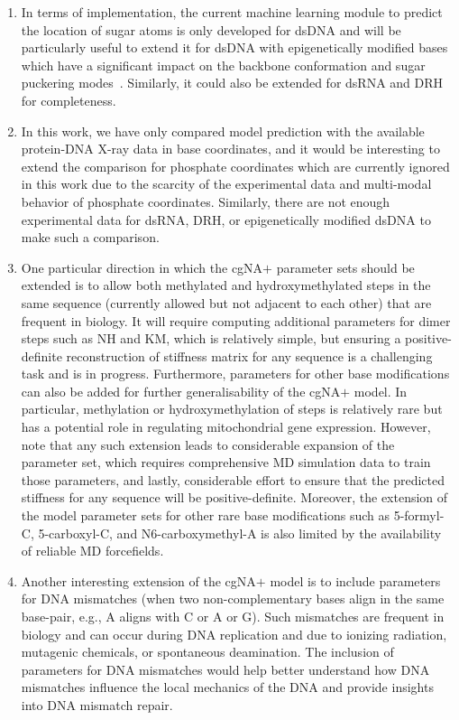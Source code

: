 \begin{enumerate}

\item  In terms of implementation, the current machine learning module to predict the location of sugar atoms is only developed for dsDNA and will be particularly useful to extend it for dsDNA with epigenetically modified bases which have a significant impact on the backbone conformation and sugar puckering modes~\cite{banyay2002structural,liebl2019methyl}.
Similarly, it could also be extended for dsRNA and DRH for completeness.

\item In this work, we have only compared model prediction with the available protein-DNA X-ray data in base coordinates, and it would be interesting to extend the comparison for phosphate coordinates which are currently ignored in this work due to the scarcity of the experimental data and multi-modal behavior of phosphate coordinates. 
Similarly, there are not enough experimental data for dsRNA, DRH, or epigenetically modified dsDNA to make such a comparison. 

\item One particular direction in which the cgNA$+$ parameter sets should be extended is to allow both methylated and hydroxymethylated \cpg steps in the same sequence (currently allowed but not adjacent to each other) that are frequent in biology.
It will require computing additional parameters for dimer steps such as NH and KM, which is relatively simple, but ensuring a positive-definite reconstruction of stiffness matrix for any sequence is a challenging task and is in progress.
Furthermore, parameters for other base modifications can also be added for further generalisability of the cgNA$+$ model. 
In particular, methylation or hydroxymethylation of \gpc steps is relatively rare but has a potential role in regulating mitochondrial gene expression.
However, note that any such extension leads to considerable expansion of the parameter set, which requires comprehensive MD simulation data to train those parameters, and lastly, considerable effort to ensure that the predicted stiffness for any sequence will be positive-definite.
Moreover, the extension of the model parameter sets for other rare base modifications such as 5-formyl-C, 5-carboxyl-C, and N6-carboxymethyl-A is also limited by the availability of reliable MD forcefields.

\item Another interesting extension of the cgNA$+$ model is to include parameters for DNA mismatches (when two non-complementary bases align in the same base-pair, e.g., A aligns with C or A or G).
Such mismatches are frequent in biology and can occur during DNA replication and due to ionizing radiation, mutagenic chemicals, or spontaneous deamination.
The inclusion of parameters for DNA mismatches would help better understand how DNA mismatches influence the local mechanics of the DNA and provide insights into DNA mismatch repair.



\end{enumerate}
